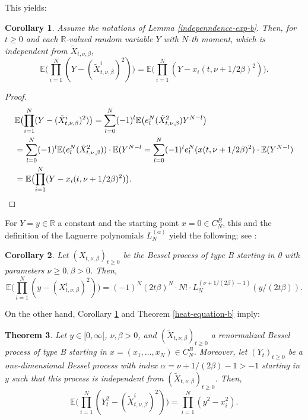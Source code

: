 \documentclass[reqno]{amsart}
\theoremstyle{plain}
\newtheorem{theorem}{Theorem}[section]
\newtheorem{corollary}[theorem]{Corollary}
\theoremstyle{definition}
\numberwithin{equation}{section}
\begin{document}
This yields:

\begin{corollary}\label{exp-independence-b-cor} 
  Assume the notations of Lemma \ref{indepenndence-exp-b}.
  Then,  for
 $t\ge0$ and each $\mathbb R$-valued random variable $Y$ with $N$-th moment, which is independent from $\tilde X_{t,\nu,\beta}$,
$$\mathbb E\bigl(\prod_{i=1}^N (Y- (\tilde X_{t,\nu,\beta}^i)^2)\bigr)=\mathbb E\bigl(\prod_{i=1}^N (Y- x_i(t,\nu+1/2\beta)^2)\bigr).$$
\end{corollary}

\begin{proof}
\begin{align}\label{det-computation-1a}
&\mathbb E\bigl(\prod_{i=1}^N (Y- (\tilde X_{t,\nu,\beta}^i)^2)\bigr)=
\sum_{l=0}^N (-1)^l\mathbb E\bigl(e_l^N( \tilde X_{t,\nu,\beta}^2 ) Y^{N-l}\bigr)\notag\\
&=\sum_{l=0}^N (-1)^l\mathbb E(e_l^N( \tilde X_{t,\nu,\beta}^2 )) \cdot\mathbb E(Y^{N-l}
=\sum_{l=0}^N (-1)^l  e_l^N(x(t,\nu+1/2\beta)^2) \cdot \mathbb E(Y^{N-l})   \notag\\
&=\mathbb E\bigl(\prod_{i=1}^N (Y- x_i(t,\nu+1/2\beta)^2)\bigr) .
\notag\end{align}
\end{proof}

For $Y=y\in\mathbb R$ a constant and the starting point $x=0\in C_N^B$, this and the definition of
the Laguerre polynomials $L_N^{(\alpha)}$ yield the following; see \cite{KVW}:

\begin{corollary}\label{exp-independence-b-cor1}
Let $( X_{t,\nu,\beta})_{t\ge0}$ be the Bessel process of type B
starting in 0 with parameters  $\nu\ge 0,\beta>0$.
Then, 
$$\mathbb E\bigl(\prod_{i=1}^N (y- (X_{t,\nu,\beta}^i)^2)\bigr)  = (-1)^N(2t \beta)^{N}\cdot N!\cdot L_N^{(\nu+1/(2\beta)-1)}(y/(2t\beta)).$$
\end{corollary}

On the other hand, Corollary \ref{exp-independence-b-cor}  and Theorem \ref{heat-equation-b} imply:


\begin{theorem}\label{expectation-b}
  Let $y\in [0,\infty[$, $\nu,\beta>0$, and  $(\tilde X_{t,\nu,\beta})_{t\ge0}$ a renormalized Bessel process of type B
  starting in $x=(x_1,\ldots,x_N)\in C_N^B$. Moreover, let $(Y_t)_{t\ge0} $
  be a  one-dimensional Bessel process  with index $\alpha= \nu+1/(2\beta)   -1>-1$ starting in
  $y$ such that this process is
independent from  $(\tilde X_{t,\nu,\beta})_{t\ge0}$. Then,
\begin{equation}\label{equ-expectation-b}
\mathbb E\bigl(\prod_{i=1}^N (Y_t^2- (\tilde X_{t,\nu,\beta}^i)^2)\bigr)=\prod_{i=1}^N (y^2- x_i^2).
\end{equation}
\end{theorem}
\end{document}
